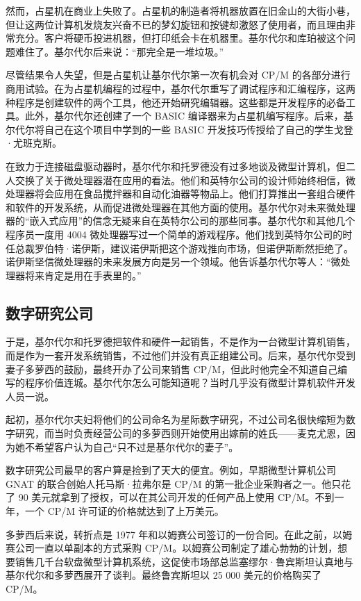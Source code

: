 \documentclass[12pt,UTF8]{ctexbook}
\begin{document}
然而，占星机在商业上失败了。占星机的制造者将机器放置在旧金山的大街小巷，但让这两位计算机发烧友兴奋不已的梦幻旋钮和按键却激怒了使用者，而且理由非常充分。客户将硬币投进机器，但打印纸会卡在机器里。基尔代尔和库珀被这个问题难住了。基尔代尔后来说：“那完全是一堆垃圾。”

尽管结果令人失望，但是占星机让基尔代尔第一次有机会对 CP/M 的各部分进行商用试验。在为占星机编程的过程中，基尔代尔重写了调试程序和汇编程序，这两种程序是创建软件的两个工具，他还开始研究编辑器。这些都是开发程序的必备工具。此外，基尔代尔还创建了一个 BASIC 编译器来为占星机编写程序。后来，基尔代尔将自己在这个项目中学到的一些 BASIC 开发技巧传授给了自己的学生戈登·尤班克斯。

在致力于连接磁盘驱动器时，基尔代尔和托罗德没有过多地谈及微型计算机，但二人交换了关于微处理器潜在应用的看法。他们和英特尔公司的设计师始终相信，微处理器将会应用在食品搅拌器和自动化油器等物品上。他们打算推出一套组合硬件和软件的开发系统，从而促进微处理器在其他方面的使用。基尔代尔对未来微处理器的“嵌入式应用”的信念无疑来自在英特尔公司的那些同事。基尔代尔和其他几个程序员一度用 4004 微处理器写过一个简单的游戏程序。他们找到英特尔公司的时任总裁罗伯特·诺伊斯，建议诺伊斯把这个游戏推向市场，但诺伊斯断然拒绝了。诺伊斯坚信微处理器的未来发展方向是另一个领域。他告诉基尔代尔等人：“微处理器将来肯定是用在手表里的。”





\subsection{数字研究公司}


于是，基尔代尔和托罗德把软件和硬件一起销售，不是作为一台微型计算机销售，而是作为一套开发系统销售，不过他们并没有真正组建公司。后来，基尔代尔受到妻子多萝西的鼓励，最终开办了公司来销售 CP/M，但此时他完全不知道自己编写的程序价值连城。基尔代尔怎么可能知道呢？当时几乎没有微型计算机软件开发人员一说。

起初，基尔代尔夫妇将他们的公司命名为星际数字研究，不过公司名很快缩短为数字研究，而当时负责经营公司的多萝西则开始使用出嫁前的姓氏——麦克尤恩，因为她不希望客户认为自己“只不过是基尔代尔的妻子”。

数字研究公司最早的客户算是捡到了天大的便宜。例如，早期微型计算机公司 GNAT 的联合创始人托马斯·拉弗尔是 CP/M 的第一批企业采购者之一。他只花了 90 美元就拿到了授权，可以在其公司开发的任何产品上使用 CP/M。不到一年，一个 CP/M 许可证的价格就达到了上万美元。

多萝西后来说，转折点是 1977 年和以姆赛公司签订的一份合同。在此之前，以姆赛公司一直以单副本的方式采购 CP/M。以姆赛公司制定了雄心勃勃的计划，想要销售几千台软盘微型计算机系统，这促使市场部总监塞缪尔·鲁宾斯坦认真地与基尔代尔和多萝西展开了谈判。最终鲁宾斯坦以 25 000 美元的价格购买了 CP/M。
\end{document}

